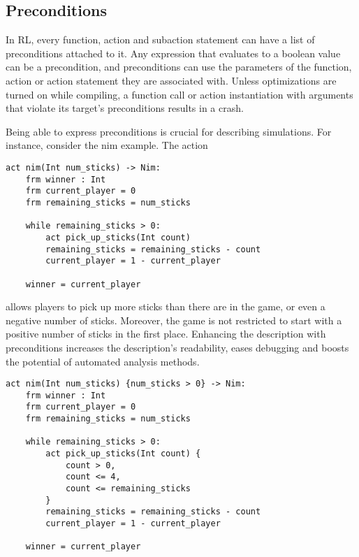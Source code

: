 \subsection{Preconditions}
In RL, every function, action and subaction statement can have a list of preconditions attached to it.
Any expression that evaluates to a boolean value can be a precondition, and preconditions can use the parameters of the function, action or action statement they are associated with.
Unless optimizations are turned on while compiling, a function call or action instantiation with arguments that violate its target's preconditions results in a crash.

Being able to express preconditions is crucial for describing simulations.
For instance, consider the nim example. The action 
\begin{lstlisting}
act nim(Int num_sticks) -> Nim:
    frm winner : Int
    frm current_player = 0
    frm remaining_sticks = num_sticks

    while remaining_sticks > 0:
        act pick_up_sticks(Int count)
        remaining_sticks = remaining_sticks - count
        current_player = 1 - current_player

    winner = current_player
\end{lstlisting}
allows players to pick up more sticks than there are in the game, or even a negative number of sticks.
Moreover, the game is not restricted to start with a positive number of sticks in the first place.
Enhancing the description with preconditions increases the description's readability, eases debugging and boosts the potential of automated analysis methods.
\begin{lstlisting}
act nim(Int num_sticks) {num_sticks > 0} -> Nim:
    frm winner : Int
    frm current_player = 0
    frm remaining_sticks = num_sticks

    while remaining_sticks > 0:
        act pick_up_sticks(Int count) {
            count > 0,
            count <= 4,
            count <= remaining_sticks
        }
        remaining_sticks = remaining_sticks - count
        current_player = 1 - current_player

    winner = current_player
\end{lstlisting}
